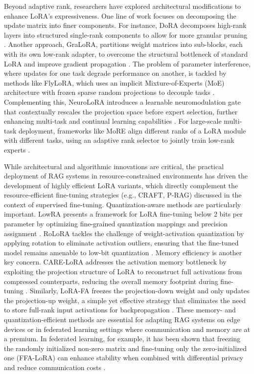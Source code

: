 \documentclass[11pt]{article}
\begin{document}
Beyond adaptive rank, researchers have explored architectural modifications to enhance LoRA's expressiveness. One line of work focuses on decomposing the update matrix into finer components. For instance, DoRA decomposes high-rank layers into structured single-rank components to allow for more granular pruning \cite{ref233}. Another approach, GraLoRA, partitions weight matrices into sub-blocks, each with its own low-rank adapter, to overcome the structural bottleneck of standard LoRA and improve gradient propagation \cite{ref234}. The problem of parameter interference, where updates for one task degrade performance on another, is tackled by methods like FlyLoRA, which uses an implicit Mixture-of-Experts (MoE) architecture with frozen sparse random projections to decouple tasks \cite{ref235}. Complementing this, NeuroLoRA introduces a learnable neuromodulation gate that contextually rescales the projection space before expert selection, further enhancing multi-task and continual learning capabilities \cite{ref236}. For large-scale multi-task deployment, frameworks like MoRE align different ranks of a LoRA module with different tasks, using an adaptive rank selector to jointly train low-rank experts \cite{ref237}.

While architectural and algorithmic innovations are critical, the practical deployment of RAG systems in resource-constrained environments has driven the development of highly efficient LoRA variants, which directly complement the resource-efficient fine-tuning strategies (e.g., CRAFT, P-RAG) discussed in the context of supervised fine-tuning. Quantization-aware methods are particularly important. LowRA presents a framework for LoRA fine-tuning below 2 bits per parameter by optimizing fine-grained quantization mappings and precision assignment \cite{ref238}. RoLoRA tackles the challenge of weight-activation quantization by applying rotation to eliminate activation outliers, ensuring that the fine-tuned model remains amenable to low-bit quantization \cite{ref239}. Memory efficiency is another key concern. CARE-LoRA addresses the activation memory bottleneck by exploiting the projection structure of LoRA to reconstruct full activations from compressed counterparts, reducing the overall memory footprint during fine-tuning \cite{ref240}. Similarly, LoRA-FA freezes the projection-down weight and only updates the projection-up weight, a simple yet effective strategy that eliminates the need to store full-rank input activations for backpropagation \cite{ref241}. These memory- and quantization-efficient methods are essential for adapting RAG systems on edge devices or in federated learning settings where communication and memory are at a premium. In federated learning, for example, it has been shown that freezing the randomly initialized non-zero matrix and fine-tuning only the zero-initialized one (FFA-LoRA) can enhance stability when combined with differential privacy and reduce communication costs \cite{ref242}.
\end{document}
